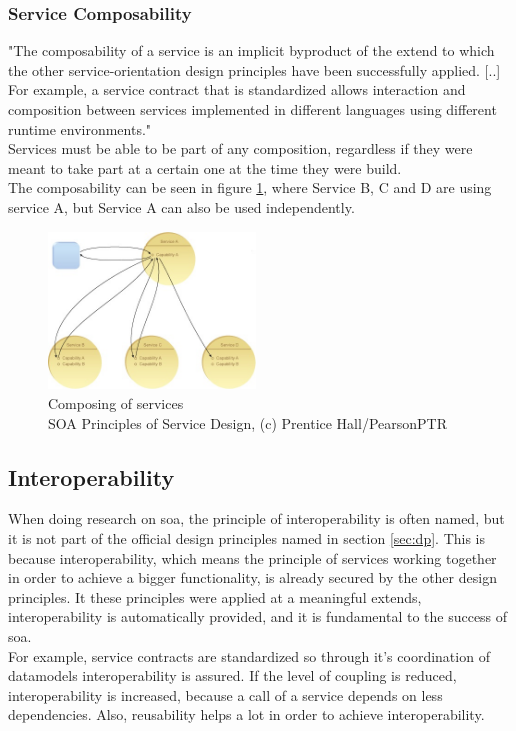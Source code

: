 \documentclass[12pt]{article}
\begin{document}
\subsubsection{Service Composability} 
"The composability of a service is an implicit byproduct of the extend to which the other service-orientation design principles have been successfully applied. [..] For example, a service contract that is standardized allows interaction and composition between services implemented in different languages using different runtime environments."\cite[page 189]{grau}\\
Services must be able to be part of any composition, regardless if they were meant to take part at a certain one at the time they were build. \cite[page 89]{te} \\
The composability can be seen in figure \ref{fig:composserv}, where Service B, C and D are using service A, but Service A can also be used independently.

\begin{figure}
	\centering
	\includegraphics[width=0.49\textwidth]{images/serivceorientationdotcom}
	\caption{Composing of services \cite{photos} \\ SOA Principles of Service Design, (c) Prentice Hall/PearsonPTR}
	\label{fig:composserv}
	\end{figure}
\FloatBarrier
 \noindent
\subsection{Interoperability}
When doing research on \gls{soa}, the principle of interoperability is often named, but it is not part of the official design principles named in section \ref{sec:dp}. This is because interoperability, which means the principle of services working together in order to achieve a bigger functionality, is already secured by the other design principles. It these principles were applied at a meaningful extends, interoperability is automatically provided, and it is fundamental to the success of \gls{soa}.\\
For example, service contracts are standardized so through it's coordination of datamodels interoperability is assured. If the level of coupling is reduced, interoperability is increased, because a call of a service depends on less dependencies. Also, reusability helps a lot in order to achieve interoperability. \cite[page 89-90]{te}
\newpage
\end{document}
